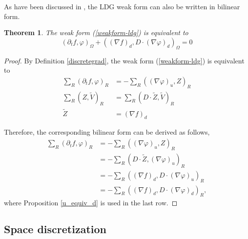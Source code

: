 \documentclass{article}
\newtheorem{theorem}{Theorem}
\numberwithin{equation}{section}
\begin{document}
As have been discussed in \cite{arnold2002unified}, the LDG weak form can also be written in bilinear form.

\begin{theorem}
    The weak form (\ref{weakform-ldg}) is equivalent to
    \begin{equation*}
        \left(\partial_{t}f,\varphi\right)_{\Omega}+\left(\left(\nabla f\right)_{d},D\cdot\left(\nabla\varphi\right)_{d}\right)_{\Omega}=0
    \end{equation*}
\end{theorem}

\begin{proof}
    By Definition \ref{discretegrad}, the weak form (\ref{weakform-ldg}) is equivalent to
\begin{equation*}
    \begin{split}
        \sum_{R}\left(\partial_{t}f,\varphi\right)_{R}&=-\sum_{R}\left(\left(\nabla\varphi\right)_{u},Z\right)_{R}\\
        \sum_{R}\left(Z,\widetilde{V}\right)_{R}&=\sum_{R}\left(D\cdot\widetilde{Z},\widetilde{V}\right)_{R}\\
        \widetilde{Z}&=\left(\nabla f\right)_{d}
    \end{split}
\end{equation*}

Therefore, the corresponding bilinear form can be derived as follows,
\begin{equation*}
    \begin{split}
        \sum_{R}\left(\partial_{t}f,\varphi\right)_{R}&=-\sum_{R}\left(\left(\nabla\varphi\right)_{u},Z\right)_{R}\\
        &=-\sum_{R}\left(D\cdot\widetilde{Z},\left(\nabla\varphi\right)_{u}\right)_{R}\\
        &=-\sum_{R}\left(\left(\nabla f\right)_{d},D\cdot\left(\nabla\varphi\right)_{u}\right)_{R}\\
        &=-\sum_{R}\left(\left(\nabla f\right)_{d},D\cdot\left(\nabla\varphi\right)_{d}\right)_{R},
    \end{split}
\end{equation*}
where Proposition \ref{u_equiv_d} is used in the last row.
\end{proof}

\subsection{Space discretization}
\end{document}
